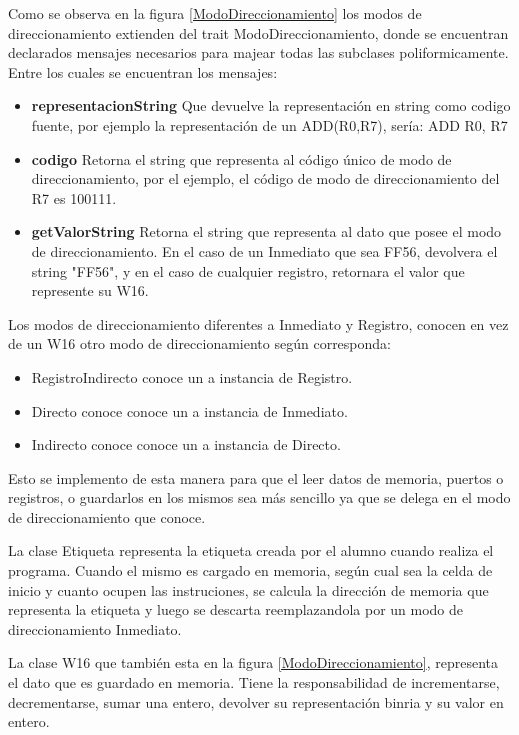 Como se observa en la figura \ref{ModoDireccionamiento} los modos de direccionamiento extienden del trait ModoDireccionamiento, donde se encuentran declarados mensajes necesarios para majear todas las subclases poliformicamente. Entre los cuales se encuentran los mensajes: 
\begin{itemize}
\item  \textbf{representacionString}
Que devuelve la representación en string como codigo fuente, por ejemplo la representación de un ADD(R0,R7), sería: ADD R0, R7
\item  \textbf{codigo}
Retorna el string que representa al código único de modo de direccionamiento, por el ejemplo, el código de modo de direccionamiento del R7 es 100111.
\item  \textbf{getValorString}
Retorna el string que representa al dato que posee el modo de direccionamiento. En el caso de un Inmediato que sea FF56, devolvera el string "FF56", y en el caso de cualquier registro, retornara el valor que represente su W16.
\end{itemize}
Los modos de direccionamiento diferentes a Inmediato y Registro, conocen en vez de un W16 otro modo de direccionamiento según corresponda:
\begin{itemize}
\item RegistroIndirecto conoce un a instancia de Registro.
\item Directo conoce conoce un a instancia de Inmediato.
\item Indirecto conoce conoce un a instancia de Directo.
\end{itemize}
Esto se implemento de esta manera para que el leer datos de memoria, puertos o registros, o guardarlos en los mismos sea más sencillo ya que se delega en el modo de direccionamiento que conoce.

La clase Etiqueta representa la etiqueta creada por el alumno cuando realiza el programa. Cuando el mismo es cargado en memoria, según cual sea la celda de inicio y cuanto ocupen las instruciones, se calcula la dirección de memoria que representa la etiqueta y luego se descarta reemplazandola por un modo de direccionamiento Inmediato.

La clase W16 que también esta en la figura \ref{ModoDireccionamiento}, representa el dato que es guardado en memoria. Tiene la responsabilidad de incrementarse, decrementarse, sumar una entero, devolver su representación binria y su valor en entero.








